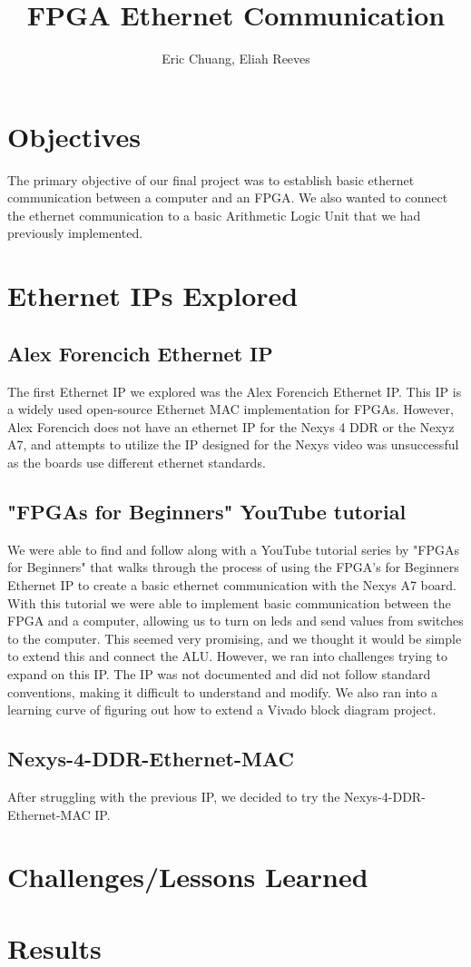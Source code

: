 \documentclass{article}
\title{FPGA Ethernet Communication}
\author{{Eric Chuang, Eliah Reeves}}
\date{\vspace{-5ex}} %
\begin{document}
\maketitle
\thispagestyle{firstpage}
\section*{Objectives}

The primary objective of our final project was to establish basic ethernet communication between a computer and an FPGA. We also wanted to connect the ethernet communication to a basic Arithmetic Logic Unit that we had previously implemented.

\section*{Ethernet IPs Explored}

\subsection*{Alex Forencich Ethernet IP}

The first Ethernet IP we explored was the Alex Forencich Ethernet IP. This IP is a widely used open-source Ethernet MAC implementation for FPGAs. However, Alex Forencich does not have an ethernet IP for the Nexys 4 DDR or the Nexyz A7, and attempts to utilize the IP designed for the Nexys video was unsuccessful as the boards use different ethernet standards.

\subsection*{"FPGAs for Beginners" YouTube tutorial}

We were able to find and follow along with a YouTube tutorial series by "FPGAs for Beginners" that walks through the process of using the FPGA's for Beginners Ethernet IP to create a basic ethernet communication with the Nexys A7 board. With this tutorial we were able to implement basic communication between the FPGA and a computer, allowing us to turn on leds and send values from switches to the computer. This seemed very promising, and we thought it would be simple to extend this and connect the ALU. However, we ran into challenges trying to expand on this IP. The IP was not documented and did not follow standard conventions, making it difficult to understand and modify. We also ran into a learning curve of figuring out how to extend a Vivado block diagram project.

\subsection*{Nexys-4-DDR-Ethernet-MAC}

After struggling with the previous IP, we decided to try the Nexys-4-DDR-Ethernet-MAC IP.

\section*{Challenges/Lessons Learned}

\section*{Results}
\end{document}
